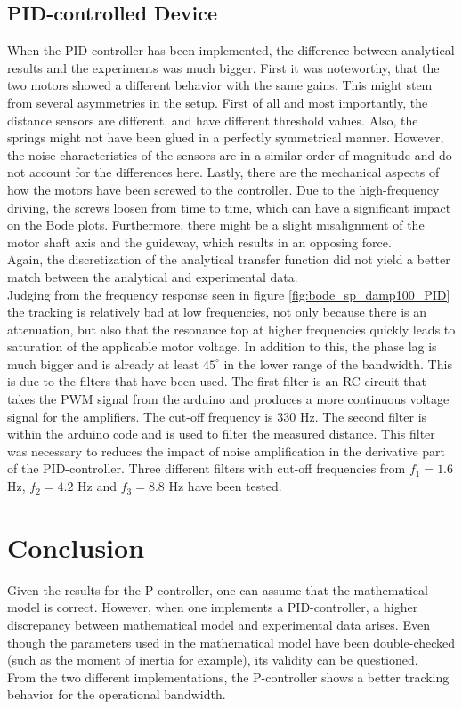 \subsection{PID-controlled Device}
When the PID-controller has been implemented, the difference between analytical results and the experiments was much bigger. First it was noteworthy, that the two motors showed a different behavior with the same gains. This might stem from several asymmetries in the setup. First of all and most importantly, the distance sensors are different, and have different threshold values. Also, the springs might not have been glued in a perfectly symmetrical manner. However, the noise characteristics of the sensors are in a similar order of magnitude and do not account for the differences here. Lastly, there are the mechanical aspects of how the motors have been screwed to the controller. Due to the high-frequency driving, the screws loosen from time to time, which can have a significant impact on the Bode plots. Furthermore, there might be a slight misalignment of the motor shaft axis and the guideway, which results in an opposing force.\\
Again, the discretization of the analytical transfer function did not yield a better match between the analytical and experimental data.\\
Judging from the frequency response seen in figure \ref{fig:bode_sp_damp100_PID} the tracking is relatively bad at low frequencies, not only because there is an attenuation, but also that the resonance top at higher frequencies quickly leads to saturation of the applicable motor voltage. In addition to this, the phase lag is much bigger and is already at least $45 ^\circ$ in the lower range of the bandwidth. This is due to the filters that have been used. The first filter is an RC-circuit that takes the PWM signal from the arduino and produces a more continuous voltage signal for the amplifiers. The cut-off frequency is $330$ Hz. The second filter is within the arduino code and is used to filter the measured distance. This filter was necessary to reduces the impact of noise amplification in the derivative part of the PID-controller. Three different filters with cut-off frequencies from $f_1 = 1.6$ Hz, $f_2 = 4.2$ Hz and $f_3 = 8.8$ Hz have been tested.


\section{Conclusion}
Given the results for the P-controller, one can assume that the mathematical model is correct. However, when one implements a PID-controller, a higher discrepancy between mathematical model and experimental data arises. Even though the parameters used in the mathematical model have been double-checked (such as the moment of inertia for example), its validity can be questioned.\\
From the two different implementations, the P-controller shows a better tracking behavior for the operational bandwidth.

